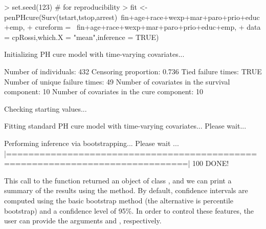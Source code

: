 \begin{example}
> set.seed(123) # for reproducibility
> fit <- penPHcure(Surv(tstart,tstop,arrest)~fin+age+race+wexp+mar+paro+prio+educ+emp,
+                  cureform = ~fin+age+race+wexp+mar+paro+prio+educ+emp,
+                  data = cpRossi,which.X = "mean",inference = TRUE)

Initializing PH cure model with time-varying covariates...

Number of individuals: 432
Censoring proportion: 0.736
Tied failure times: TRUE
Number of unique failure times: 49
Number of covariates in the survival component: 10
Number of covariates in the cure component: 10

Checking starting values...

Fitting standard PH cure model with time-varying covariates... Please wait...

Performing inference via bootstrapping... Please wait ...
  |==============================================================================| 100%
DONE!
\end{example}

This call to the  function returned an object of class , and we can print a summary of the results using the  method.
By default, confidence intervals are computed using the basic bootstrap method (the alternative is percentile bootstrap) and a confidence level of 95\%.
In order to control these features, the user can provide the arguments  and , respectively.

